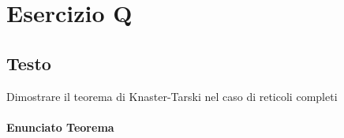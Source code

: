 \documentclass{article}
\begin{document}
\begin{comment}
\paragraph{Caso Induttivo S=$\sum_{i\inI}Pi$} In questo caso $S=P_{1}+P_{2}+P_{3}+...$ e per ipotesi induttiva sappiamo che ogni $Pi$ è finito e termina in un numero finito di passi. In questo caso il processo $S$ fa un passo e va in $S'=Pi$ per qualche $i \in I$, quindi $size(S') = size(Pi)$ che per ipotesi è finita dato che il processo termina; $size(S)=max\{size(Pi), i\in I\}$ ma siccome ogni processo $Pi$ è finito per ipotesi, il massimo elemento è comunque finito, e quindi il processo termina in un numero finito di passi dato se si aggiunge un passo (quello della scelta).


Alt: se ci sono $0$ processi il caso base è banale. Per $n+1$ processi sappiamo che per $n$ è vero per ipotesi induttiva$_{2}$ e aggiungendo un processo $P_{n+1}$, quindi la scelta si riduce tra gli $n$ programmi precedenti e l'$n+1$esimo, ma $P_{n+1}$ ha derivazione di lunghezza finita per ipotesi, per cui siccome il numero di passi di S è delimitato dal numero di passi del più grade processo $P_{i}$ all'interno della somma, se tutti sono finiti anche $S$ sarà finito.

\end{comment}




\section{Esercizio Q}
\subsection{Testo}
Dimostrare il teorema di Knaster-Tarski nel caso di reticoli completi


\paragraph{Enunciato Teorema}
\end{document}
